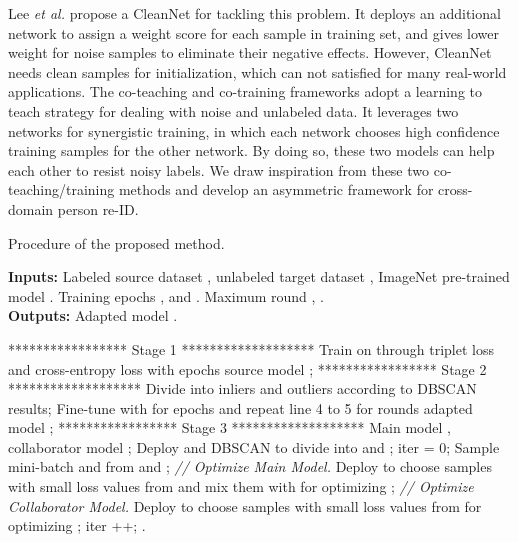\documentclass[letterpaper]{article} \usepackage{aaai20}  \usepackage{times}  \usepackage{helvet} \usepackage{courier}  \usepackage[hyphens]{url}  \usepackage{graphicx} \urlstyle{rm} \def\UrlFont{\rm}  \usepackage{graphicx}  \frenchspacing  \setlength{\pdfpagewidth}{8.5in}  \setlength{\pdfpageheight}{11in}  \usepackage{color}
\begin{document}
Lee \emph{et al.} \cite{lee2018cleannet} propose a CleanNet for tackling this problem. It deploys an additional network to assign a weight score for each sample in training set, and gives lower weight for noise samples to eliminate their negative effects. However, CleanNet needs clean samples for initialization, which can not satisfied for many real-world applications. The co-teaching and co-training frameworks \cite{han2018co,ma2017self} adopt a learning to teach strategy for dealing with noise and unlabeled data. It leverages two networks for synergistic training, in which each network chooses high confidence training samples for the other network. By doing so, these two models can help each other to resist noisy labels. We draw inspiration from these two co-teaching/training methods and develop an asymmetric framework for cross-domain person re-ID.



\begin{algorithm}[!ht]
  \caption{Procedure of the proposed method.}
  \label{alg:asyCo}
  \textbf{Inputs:} Labeled source dataset , unlabeled target dataset , 
  ImageNet pre-trained model . Training epochs ,  and . Maximum round , . \\
  \textbf{Outputs:} Adapted model . \\
  \begin{algorithmic}[1]
    \STATE ****************** Stage 1 *******************
    \STATE Train  on  through triplet loss and cross-entropy loss with  epochs  source model ;
    \STATE ****************** Stage 2 *******************
    \STATE Divide  into inliers  and outliers  according 
    to DBSCAN results;
    \STATE Fine-tune  with  for  epochs and repeat line 4 to 5 for  rounds  adapted model ;
    \STATE ****************** Stage 3 *******************
    \STATE Main model   , collaborator model   ;
      \STATE Deploy  and DBSCAN to divide  into  and ;
        \STATE iter = 0;
        \REPEAT
          \STATE Sample mini-batch  and  from  and ;
            \STATE \textit{// Optimize Main Model.}
            \STATE Deploy  to choose samples with small loss values from  and mix them with  for optimizing ;
          \ELSE 
            \STATE \textit{// Optimize Collaborator Model.} 
            \STATE Deploy  to choose samples with small loss values from  for optimizing ;
          \ENDIF
        \STATE iter ++;
      \ENDFOR
    \ENDFOR
    \STATE   .
  \end{algorithmic}
\end{algorithm}
\end{document}
